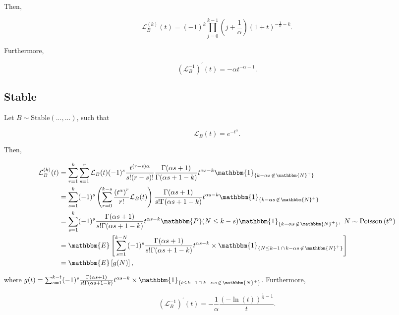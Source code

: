 \documentclass[11pt, english]{article}\usepackage[]{graphicx}\usepackage[]{color}
\begin{document}
Then,

$$ \mathcal{L}_B^{(k)}(t) = (-1)^k \prod_{j = 0}^{k - 1} \left(j + \frac{1}{\alpha}\right) (1 + t)^{-\frac{1}{\alpha} - k}. $$

Furthermore,

$$ \left(\mathcal{L}_B^{-1}\right)^\prime(t) = -\alpha t^{-\alpha - 1}. $$

\subsection{Stable}

Let $B \sim \mathrm{Stable}(..., ...)$, such that

\begin{equation}
  \mathcal{L}_B(t) = e^{-t^\alpha}.
\end{equation}

Then,

\begin{align*}
  \mathcal{L}^{(k)}_B(t) &= \sum_{r = 1}^k \sum_{s = 1}^r \mathcal{L}_B(t) (-1)^s \frac{t^{(r - s) \alpha}}{s! (r - s)!} \frac{\Gamma(\alpha s + 1)}{\Gamma(\alpha s + 1 - k)} t^{\alpha s - k} \mathbbm{1}_{\{k - \alpha s \, \not\in \, \mathbbm{N}^+\}} \\
  &= \sum_{s = 1}^k (-1)^s \left( \sum_{r = 0}^{k - s} \frac{\left(t^{\alpha}\right)^r}{r!} \mathcal{L}_B(t) \right) \frac{\Gamma(\alpha s + 1)}{s! \Gamma(\alpha s + 1 - k)} t^{\alpha s - k} \mathbbm{1}_{\{k - \alpha s \, \not\in \, \mathbbm{N}^+\}} \\
  &= \sum_{s = 1}^k (-1)^s \frac{\Gamma(\alpha s + 1)}{s! \Gamma(\alpha s + 1 - k)} t^{\alpha s - k} \mathbbm{P}(N \le k - s) \mathbbm{1}_{\{k - \alpha s \, \not\in \, \mathbbm{N}^+\}}, \, \, N \sim \mathrm{Poisson}\left(t^\alpha\right) \\
  &= \mathbbm{E} \left[ \sum_{s = 1}^{k - N}(-1)^s \frac{\Gamma(\alpha s + 1)}{s! \Gamma(\alpha s + 1 - k)} t^{\alpha s - k} \times \mathbbm{1}_{\{N \le k - 1 \, \cap \, k - \alpha s \, \not\in \, \mathbbm{N}^+\}} \right] \\
  &= \mathbbm{E} \left[ g(N) \right],
\end{align*}

where $g(t) = \sum_{s = 1}^{k - t}(-1)^s \frac{\Gamma(\alpha s + 1)}{s! \Gamma(\alpha s + 1 - k)} t^{\alpha s - k} \times \mathbbm{1}_{\{t \le k - 1 \, \cap \, k - \alpha s \, \not\in \, \mathbbm{N}^+\}}$. Furthermore,

$$ \left(\mathcal{L}_B^{-1}\right)^{\prime}(t) = -\frac{1}{\alpha} \frac{(-\ln(t))^{\frac{1}{\alpha} - 1}}{t}. $$

\newpage



\end{document}
